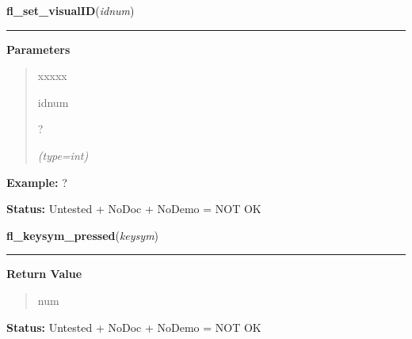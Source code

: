 \hspace{.8\funcindent}\begin{boxedminipage}{\funcwidth}

    \raggedright \textbf{fl\_set\_visualID}(\textit{idnum})

    \vspace{-1.5ex}

    \rule{\textwidth}{0.5\fboxrule}
\setlength{\parskip}{2ex}
\setlength{\parskip}{1ex}
      \textbf{Parameters}
      \vspace{-1ex}

      \begin{quote}
        \begin{Ventry}{xxxxx}

          \item[idnum]

          ?

            {\it (type=int)}

        \end{Ventry}

      \end{quote}

\textbf{Example:} ?



\textbf{Status:} Untested + NoDoc + NoDemo = NOT OK



    \end{boxedminipage}

    \label{xformslib:flxbasic:fl_keysym_pressed}

    \vspace{0.5ex}

\hspace{.8\funcindent}\begin{boxedminipage}{\funcwidth}

    \raggedright \textbf{fl\_keysym\_pressed}(\textit{keysym})

    \vspace{-1.5ex}

    \rule{\textwidth}{0.5\fboxrule}
\setlength{\parskip}{2ex}
\setlength{\parskip}{1ex}
      \textbf{Return Value}
    \vspace{-1ex}

      \begin{quote}
      num

      \end{quote}

\textbf{Status:} Untested + NoDoc + NoDemo = NOT OK



    \end{boxedminipage}

